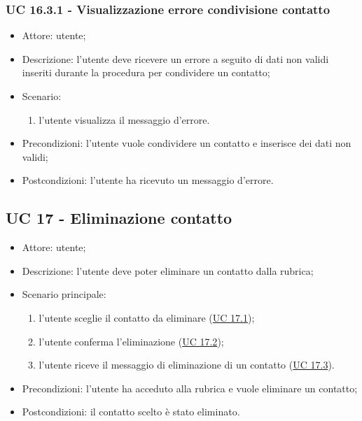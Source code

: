 \subsubsection{UC 16.3.1 - Visualizzazione errore condivisione contatto} \label{sec: UC 16.3.1}
\begin{itemize}
    \item Attore: utente;
    \item Descrizione: l'utente deve ricevere un errore a seguito di dati non validi inseriti durante la procedura per condividere un contatto;
    \item Scenario:
        \begin{enumerate}
        \item l'utente visualizza il messaggio d'errore.
        \end{enumerate}
    
    \item Precondizioni: l'utente vuole condividere un contatto e inserisce dei dati non validi;
    \item Postcondizioni: l'utente ha ricevuto un messaggio d'errore.
\end{itemize}



\subsection{UC 17 - Eliminazione contatto}
\begin{itemize}
    \item Attore: utente;
    \item Descrizione: l'utente deve poter eliminare un contatto dalla rubrica;
    \item Scenario principale:
        \begin{enumerate}
        \item l'utente sceglie il contatto da eliminare (\hyperref[sec: UC 17.1]{UC 17.1});
        \item l'utente conferma l'eliminazione (\hyperref[sec: UC 17.2]{UC 17.2});
        \item l'utente riceve il messaggio di eliminazione di un contatto (\hyperref[sec: UC 17.3]{UC 17.3}).
        \end{enumerate}
    \item Precondizioni: l'utente ha acceduto alla rubrica e vuole eliminare un contatto;
    \item Postcondizioni: il contatto scelto è stato eliminato.
\end{itemize}

